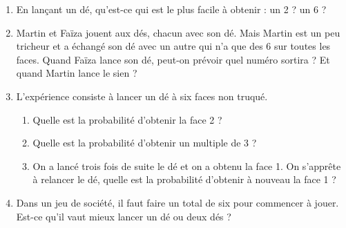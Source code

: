 
\begin{enumerate}
\item En lançant un dé, qu’est-ce qui est le plus facile à obtenir : un 2 ? un 6 ?
\item Martin et Faïza jouent aux dés, chacun avec son dé. Mais Martin est un peu tricheur  
et a échangé son dé avec un autre qui n’a que des 6 sur toutes les faces.
Quand Faïza lance son dé, peut-on prévoir quel numéro sortira ? Et quand Martin   
lance le sien ?
\item L’expérience consiste à lancer un dé à six faces non truqué.
\begin{enumerate}
\item Quelle est la probabilité d’obtenir la face 2 ?
\item Quelle est la probabilité d’obtenir un multiple de 3 ?
\item On a lancé trois fois de suite le dé et on a obtenu la face 1. On s’apprête à  
relancer le dé, quelle est la probabilité d’obtenir à nouveau la face 1 ?
\end{enumerate}
\item Dans un jeu de société, il faut faire un total de six pour commencer à jouer. Est-ce  
qu’il vaut mieux lancer un dé ou deux dés ?
\end{enumerate}
